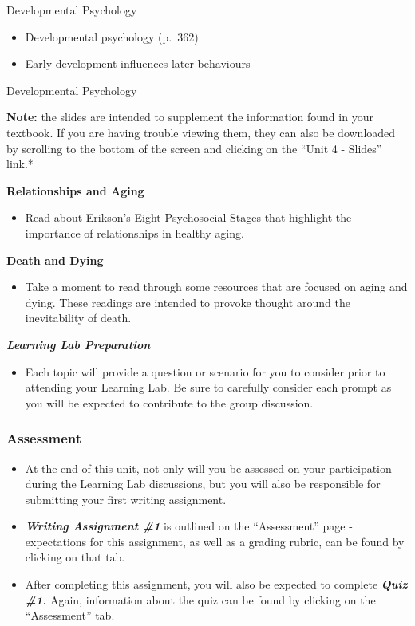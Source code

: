 \documentclass[
]{book}
\providecommand{\tightlist}{%
  \setlength{\itemsep}{0pt}\setlength{\parskip}{0pt}}
\begin{document}
Developmental Psychology

\begin{itemize}
\tightlist
\item
  Developmental psychology (p.~362)\\
\item
  Early development influences later behaviours
\end{itemize}

Developmental Psychology

\textbf{Note:} the slides are intended to supplement the information found in your textbook. If you are having trouble viewing them, they can also be downloaded by scrolling to the bottom of the screen and clicking on the ``Unit 4 - Slides'' link.*

\textbf{Relationships and Aging}

\begin{itemize}
\tightlist
\item
  Read about Erikson's Eight Psychosocial Stages that highlight the importance of relationships in healthy aging.
\end{itemize}

\textbf{Death and Dying}

\begin{itemize}
\tightlist
\item
  Take a moment to read through some resources that are focused on aging and dying. These readings are intended to provoke thought around the inevitability of death.
\end{itemize}

\textbf{\emph{Learning Lab Preparation}}

\begin{itemize}
\tightlist
\item
  Each topic will provide a question or scenario for you to consider prior to attending your Learning Lab. Be sure to carefully consider each prompt as you will be expected to contribute to the group discussion.
\end{itemize}

\hypertarget{assessment-1}{%
\subsubsection*{Assessment}\label{assessment-1}}

\begin{itemize}
\item
  At the end of this unit, not only will you be assessed on your participation during the Learning Lab discussions, but you will also be responsible for submitting your first writing assignment.
\item
  \textbf{\emph{Writing Assignment \#1}} is outlined on the ``Assessment'' page - expectations for this assignment, as well as a grading rubric, can be found by clicking on that tab.
\item
  After completing this assignment, you will also be expected to complete \textbf{\emph{Quiz \#1.}} Again, information about the quiz can be found by clicking on the ``Assessment'' tab.
\end{itemize}
\end{document}
